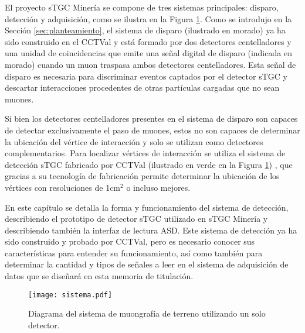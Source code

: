 El proyecto sTGC Minería se compone de tres sistemas principales: disparo, detección y adquisición, como se ilustra en la Figura \ref{fig:sistema-completo}. Como se introdujo en la Sección \ref{sec:planteamiento}, el sistema de disparo \cite{Oyanadel2020SistemaSTGC} (ilustrado en morado)  ya ha sido construido en el CCTVal y está formado por dos detectores centelladores y una unidad de coincidencias que emite una señal digital de disparo (indicada en morado)  cuando un muon traspasa ambos detectores centelladores. Esta señal de disparo es necesaria para discriminar eventos captados por el detector sTGC y descartar interacciones procedentes de otras partículas cargadas que no sean muones.
	
Si bien los detectores centelladores presentes en el sistema de disparo son capaces de detectar exclusivamente el paso de muones, estos no son capaces de determinar la ubicación del vértice de interacción y solo se utilizan como detectores complementarios. Para localizar vértices de interacción se utiliza el sistema de detección sTGC fabricado por CCTVal (ilustrado en verde en la Figura \ref{fig:sistema-completo}) , que gracias a su tecnología de fabricación permite determinar la ubicación de los vértices con resoluciones de 1cm$^2$ o incluso mejores.
	
En este capítulo se detalla la forma y funcionamiento del sistema de detección, describiendo el prototipo de detector sTGC utilizado en sTGC Minería y describiendo también la interfaz de lectura ASD. Este sistema de detección ya ha sido construido y probado por CCTVal, pero es necesario conocer sus características para entender su funcionamiento, así como también para determinar la cantidad y tipos de señales a leer en el sistema de adquisición de datos que se diseñará en esta memoria de titulación.
	
	\begin{figure}[h]
		\centering
		\texttt{[image: sistema.pdf]}
		\caption{Diagrama del sistema de muongrafía de terreno utilizando un solo detector.}
		\label{fig:sistema-completo}
	\end{figure}